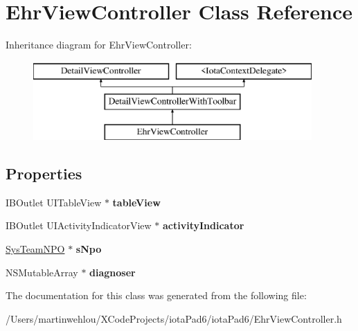 \hypertarget{interface_ehr_view_controller}{
\section{EhrViewController Class Reference}
\label{interface_ehr_view_controller}
}
Inheritance diagram for EhrViewController:\begin{figure}[H]
\begin{center}
\leavevmode
\includegraphics[height=3.000000cm]{interface_ehr_view_controller}
\end{center}
\end{figure}
\subsection*{Properties}
\begin{DoxyCompactItemize}
\item 
\hypertarget{interface_ehr_view_controller_a3ab230da44ca54c96006091dad8784e8}{
IBOutlet UITableView $\ast$ {\bfseries tableView}}
\label{interface_ehr_view_controller_a3ab230da44ca54c96006091dad8784e8}

\item 
\hypertarget{interface_ehr_view_controller_a6d548cbbdeead7a3cffcb51512259bd3}{
IBOutlet UIActivityIndicatorView $\ast$ {\bfseries activityIndicator}}
\label{interface_ehr_view_controller_a6d548cbbdeead7a3cffcb51512259bd3}

\item 
\hypertarget{interface_ehr_view_controller_abf52fc656344859ce8c4028ae59b1ee8}{
\hyperlink{interface_sys_team_n_p_o}{SysTeamNPO} $\ast$ {\bfseries sNpo}}
\label{interface_ehr_view_controller_abf52fc656344859ce8c4028ae59b1ee8}

\item 
\hypertarget{interface_ehr_view_controller_a5e6fbb9b03756cf6c0964593fab7bc0a}{
NSMutableArray $\ast$ {\bfseries diagnoser}}
\label{interface_ehr_view_controller_a5e6fbb9b03756cf6c0964593fab7bc0a}

\end{DoxyCompactItemize}


The documentation for this class was generated from the following file:\begin{DoxyCompactItemize}
\item 
/Users/martinwehlou/XCodeProjects/iotaPad6/iotaPad6/EhrViewController.h\end{DoxyCompactItemize}
